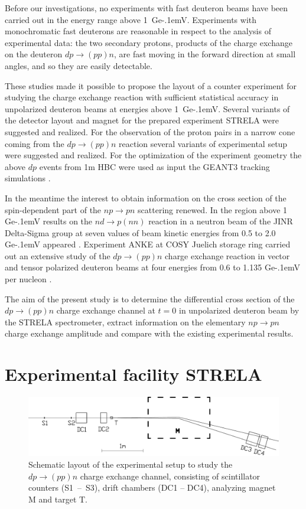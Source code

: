 \documentclass[twocolumn,epjc3]{svjour3}
\newcommand{\np}     {\ensuremath{np \rightarrow pn}\xspace}
\newcommand{\dpchex} {\ensuremath{dp \rightarrow (pp)n}\xspace}
\newcommand{\GeV}    {Ge\kern-.1emV\xspace}
\begin{document}
Before our investigations, no experiments with fast deu\-teron beams have been
carried out in the energy range above 1~\GeV. Experiments with monochromatic
fast deuterons are reasonable in respect to the analysis of experimental data:
the two secondary protons, products of the charge exchange on the deuteron
\dpchex, are fast moving in the forward direction at small angles, and so they
are easily detectable.

These studies made it possible to propose the layout of a counter experiment for
studying the charge exchange reaction with sufficient statistical accuracy in
unpolarized deuteron beams at energies above 1~\GeV. Several variants of the
detector layout and magnet for the prepared experiment STRELA were suggested and
realized. For the observation of the proton pairs in a narrow cone coming from
the \dpchex reaction several variants of experimental setup were suggested and
realized. For the optimization of the experiment geometry the above $dp$ events
from 1m HBC were used as input the GEANT3 tracking simulations \cite{gla13}.

In the meantime the interest to obtain information on the cross section of the
spin-dependent part of the \np scattering renewed. In the region above 1 \GeV
results on the $nd \rightarrow p(nn)$ reaction in a neutron beam of the JINR
Delta-Sigma group at seven values of beam kinetic energies from 0.5 to 2.0 \GeV
appeared \cite{sha09,sha09_2,shi11}. Experiment ANKE at COSY Juelich storage
ring carried out an extensive study of the \dpchex charge exchange reaction in
vector and tensor polarized deuteron beams at four energies from 0.6 to 1.135
\GeV per nucleon \cite{chi09,mch13}.

The aim of the present study is to determine the differential cross section of
the \dpchex charge exchange channel at $t = 0$ in unpolarized deuteron beam by
the STRELA spectrometer, extract information on the elementary \np charge
exchange amplitude and compare with the existing experimental results.

\section{Experimental facility STRELA}

\begin{figure}[t] %
  \centering
  \includegraphics[width=1.00\textwidth]{STRELA_layout.pdf}
  \caption{Schematic layout of the experimental setup to study the \dpchex
    charge exchange channel, consisting of scintillator counters (S1~--~S3),
    drift chambers (DC1 -- DC4), analyzing magnet M and target T.}
  \label{fig:STRELA_layout}
\end{figure}
\end{document}
